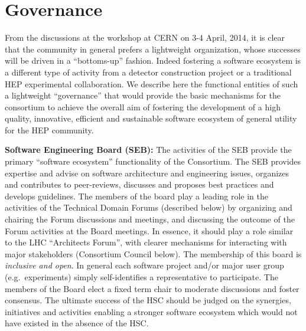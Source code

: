 \documentclass[12pt,letterpaper,fleqn]{article}
\begin{document}


\section{Governance}
\label{sec:governance}

From the discussions at the workshop at CERN on 3-4 April, 2014, it
is clear that the community in general prefers a lightweight
organization, whose successes will be driven in a ``bottoms-up''
fashion. Indeed fostering a software ecosystem is a different
type of activity from a detector construction project or a traditional
HEP experimental collaboration. We describe here the functional
entities of such a lightweight ``governance'' that would provide
the basic mechanisms for the consortium to achieve the overall
aim of fostering the development of a high quality,
innovative, efficient and sustainable software ecosystem of general
utility for the HEP community.

{\bf Software Engineering Board (SEB):} The activities of the SEB provide the primary ``software ecosystem'' functionality of the Consortium.  
The SEB provides expertise and advise on software architecture and engineering issues, organizes and contributes to peer-reviews,
discusses and proposes best practices and develops guidelines.
The members of the board play a leading role in the activities of
the Technical Domain Forums (described below) by organizing and chairing the Forum discussions and meetings, and discussing the outcome
of the Forum activities at the Board meetings. In essence, it should 
play a role similar to the LHC ``Architects Forum'', with clearer
mechanisms for interacting with major stakeholders (Consortium Council
below).
The membership of this board is {\em inclusive and open}. In general each software project and/or major user group (e.g.\ experiments) simply self-identifies a representative to participate. The members of the Board elect a fixed term chair to moderate discussions and foster consensus.
The ultimate success of the HSC should be judged on the synergies,
initiatives and activities enabling a stronger software ecosystem
which would not have existed in the absence of the HSC.
\end{document}
